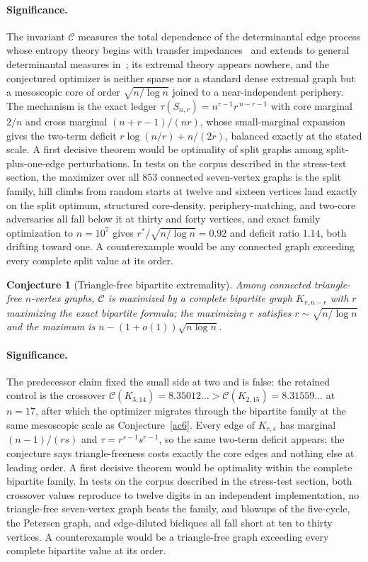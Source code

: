 \documentclass[11pt]{article}
\newtheorem{conjecture}{Conjecture}
\theoremstyle{definition}
\begin{document}
\paragraph{Significance.}
The invariant $\mathcal C$ measures the total dependence of the determinantal edge process whose entropy theory begins with transfer impedances~\cite{BP93} and extends to general determinantal measures in~\cite{Mes20}; its extremal theory appears nowhere, and the conjectured optimizer is neither sparse nor a standard dense extremal graph but a mesoscopic core of order $\sqrt{n/\log n}$ joined to a near-independent periphery.  The mechanism is the exact ledger $\tau(S_{n,r})=n^{r-1}r^{\,n-r-1}$ with core marginal $2/n$ and cross marginal $(n+r-1)/(nr)$, whose small-marginal expansion gives the two-term deficit $r\log(n/r)+n/(2r)$, balanced exactly at the stated scale.  A first decisive theorem would be optimality of split graphs among split-plus-one-edge perturbations.  In tests on the corpus described in the stress-test section, the maximizer over all $853$ connected seven-vertex graphs is the split family, hill climbs from random starts at twelve and sixteen vertices land exactly on the split optimum, structured core-density, periphery-matching, and two-core adversaries all fall below it at thirty and forty vertices, and exact family optimization to $n=10^7$ gives $r^*/\sqrt{n/\log n}=0.92$ and deficit ratio $1.14$, both drifting toward one.  A counterexample would be any connected graph exceeding every complete split value at its order.

\begin{conjecture}[Triangle-free bipartite extremality]\label{ac7}
Among connected triangle-free $n$-vertex graphs, $\mathcal C$ is maximized by a complete bipartite graph $K_{r,n-r}$ with $r$ maximizing the exact bipartite formula; the maximizing $r$ satisfies $r\sim\sqrt{n/\log n}$ and the maximum is $n-(1+o(1))\sqrt{n\log n}$.
\end{conjecture}

\paragraph{Significance.}
The predecessor claim fixed the small side at two and is false: the retained control is the crossover $\mathcal C(K_{3,14})=8.35012\ldots>\mathcal C(K_{2,15})=8.31559\ldots$ at $n=17$, after which the optimizer migrates through the bipartite family at the same mesoscopic scale as Conjecture~\ref{ac6}.  Every edge of $K_{r,s}$ has marginal $(n-1)/(rs)$ and $\tau=r^{s-1}s^{r-1}$, so the same two-term deficit appears; the conjecture says triangle-freeness costs exactly the core edges and nothing else at leading order.  A first decisive theorem would be optimality within the complete bipartite family.  In tests on the corpus described in the stress-test section, both crossover values reproduce to twelve digits in an independent implementation, no triangle-free seven-vertex graph beats the family, and blowups of the five-cycle, the Petersen graph, and edge-diluted bicliques all fall short at ten to thirty vertices.  A counterexample would be a triangle-free graph exceeding every complete bipartite value at its order.
\end{document}
